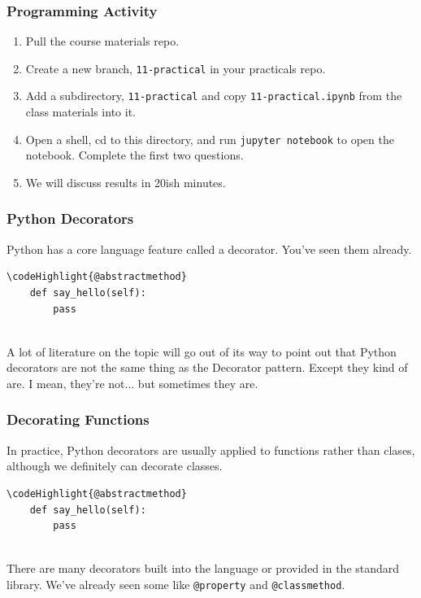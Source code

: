 \documentclass[10pt]{beamer}
\newcommand\codeHighlight[1]{\textcolor[rgb]{1,0,0}{\textbf{#1}}}
\begin{document}
\begin{frame}
  \frametitle{Programming Activity}
  
  \begin{enumerate}
    \item Pull the course materials repo.
    \item Create a new branch, \texttt{11-practical} in your practicals repo.
    \item Add a subdirectory,  \texttt{11-practical} and copy \texttt{11-practical.ipynb} from the class materials into it.
    \item Open a shell, cd to this directory, and run \texttt{jupyter notebook} to open the notebook. Complete the first two questions.
    \item We will discuss results in 20ish minutes.
  \end{enumerate}      
\end{frame}

\begin{frame}[fragile]
  \frametitle{Python Decorators}
  Python has a core language feature called a decorator. You've seen them already.
  
  \vspace{5mm}
  \begin{Verbatim}[commandchars=\\\{\}]
    \codeHighlight{@abstractmethod}
    def say_hello(self):
        pass
        
  \end{Verbatim}
  A lot of literature on the topic will go out of its way to point out that 
  Python decorators are not the same thing as the Decorator pattern. Except 
  they kind of are. I mean, they're not... but sometimes they are.      
\end{frame} 

\begin{frame}[fragile]
  \frametitle{Decorating Functions}
  In practice, Python decorators are usually applied to functions
  rather than clases, although we definitely can decorate classes. 
  
  \vspace{5mm}
  \begin{Verbatim}[commandchars=\\\{\}]
    \codeHighlight{@abstractmethod}
    def say_hello(self):
        pass
        
  \end{Verbatim}
  There are many decorators built into the language or provided in the standard library.
  We've already seen some like \texttt{@property} and \texttt{@classmethod}.    
\end{frame} 
\end{document}
